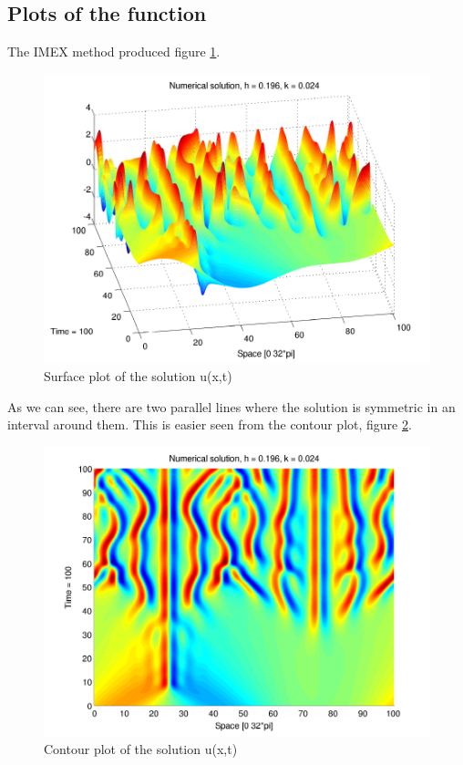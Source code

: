 \subsection{Plots of the function}
The IMEX method produced figure \ref{fig:surface}.

\begin{figure}[H]
\centering
\includegraphics[scale=0.7]
{../PDFs/IMEX/KS_plot_surface.pdf}
\caption{Surface plot of the solution u(x,t)}
\label{fig:surface}
\end{figure}

As we can see, there are two parallel lines where the solution is symmetric in an interval around them. This is easier seen from the contour plot, figure \ref{fig:contour}.

\begin{figure}[H]
\centering
\includegraphics[scale=0.65]
{../PDFs/IMEX/KS_plot_contour.pdf}
\caption{Contour plot of the solution u(x,t)}
\label{fig:contour}
\end{figure}

